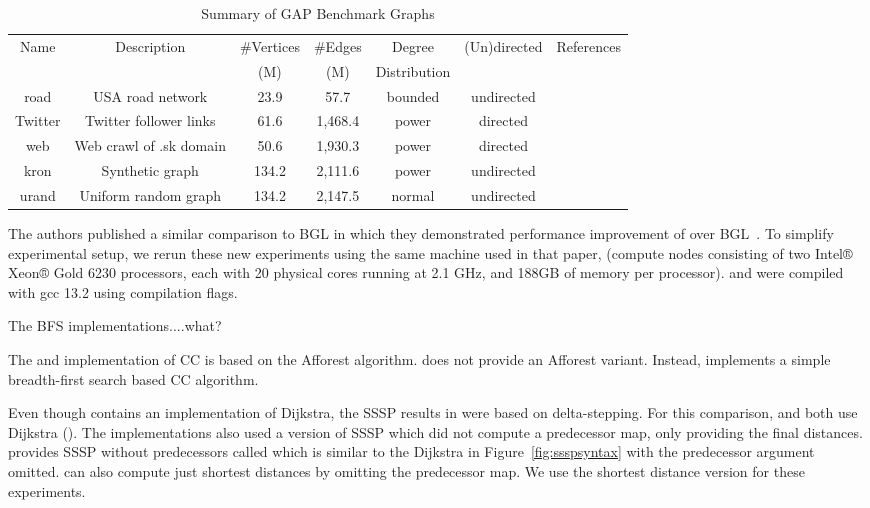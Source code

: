 \begin{table}[h!]
\centering
\begin{tabular}{c c c c c c c}
Name & Description & \#Vertices & \#Edges & Degree & (Un)directed & References \\
     &             & (M)        & (M)     & Distribution & & \\\hline
road & USA road network & 23.9 & 57.7 & bounded & undirected & \cite{dimacs9th}\\\hline
Twitter & Twitter follower links & 61.6 & 1,468.4 & power & directed & \cite{Twitter}\\\hline
web & Web crawl of .sk domain & 50.6 & 1,930.3 & power & directed & \cite{LAW1}\\\hline
kron & Synthetic graph & 134.2 & 2,111.6 & power & undirected & \cite{Graph500} \\\hline
urand & Uniform random graph & 134.2 & 2,147.5 & normal & undirected & \cite{Erdos}\\\hline
\end{tabular}
\caption{Summary of GAP Benchmark Graphs}
\label{tab:gap_graphs}
\end{table}

The \nwgraph authors published a similar comparison to BGL in which they
demonstrated performance improvement of \nwgraph over BGL~\cite{REF_nwgraph_paper}.
To simplify experimental setup, we rerun these new experiments using the same machine used in that paper,
(compute nodes consisting of two Intel® Xeon® Gold 6230 processors, each with 20 physical cores running at 2.1 GHz,
and 188GB of memory per processor).
\nwgraph and \stdgraph were compiled with gcc 13.2 using  compilation flags.  

The BFS implementations....what?

The \nwgraph and \stdgraph implementation of CC is based on the Afforest \cite{sutton2018optimizing} algorithm.  \bgl does not provide an Afforest variant.  Instead, \bgl implements a simple breadth-first
search based CC algorithm.

Even though \nwgraph contains an implementation of Dijkstra, the SSSP results in \cite{REF_nwgraph_paper}
were based on delta-stepping. For this comparison, \stdgraph and \nwgraph both use Dijkstra ().
The \nwgraph implementations also used a version of SSSP which did not compute
a predecessor map, only providing the final distances.
\stdgraph provides SSSP without predecessors called  which is similar to the Dijkstra in
Figure~\ref{fig:ssspsyntax} with the predecessor argument omitted.
\bgl can also compute just shortest distances by omitting the predecessor map.
We use the shortest distance version for these experiments.

